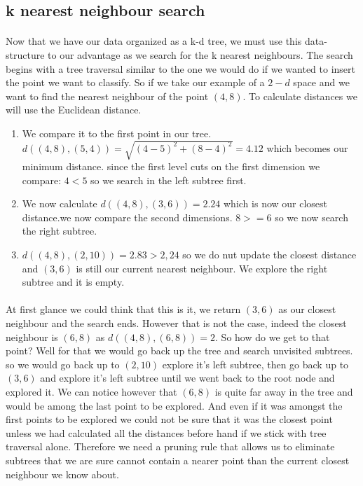 \documentclass[11 pt]{article}
\begin{document}
\subsection{k nearest neighbour search}
\paragraph{}Now that we have our data organized as a k-d tree, we must use this data-structure to our advantage as we search for the k nearest neighbours. The search begins with a tree traversal similar to the one we would do if we wanted to insert the point we want to classify. So if we take our example of a $2-d$ space and we want to find the nearest neighbour of the point $(4,8)$. To calculate distances we will use the Euclidean distance.
\begin{enumerate}
  \item We compare it to the first point in our tree. $d((4,8),(5,4)) = \sqrt{(4-5)^2+(8-4)^2}=4.12$ which becomes our minimum distance. since the first level cuts on the first dimension we compare: $4 < 5$ so we search in the left subtree first.
  \item We now calculate $d((4,8),(3,6))=2.24$ which is now our closest distance.we now compare the second dimensions. $8>=6$ so we now search the right subtree.
  \item $d((4,8),(2,10))=2.83 >2,24$ so we do nut update the closest distance and $(3,6)$ is still our current nearest neighbour. We explore the right subtree and it is empty.
\end{enumerate}
\paragraph{}At first glance we could think that this is it, we return $(3,6)$ as our closest neighbour and the search ends. However that is not the case, indeed the closest neighbour is $(6,8)$ as $d((4,8),(6,8))=2$. So how do we get to that point? Well for that we would go back up the tree and search unvisited subtrees. so we would go back up to $(2,10)$ explore it's left subtree, then go back up to $(3,6)$ and explore it's left subtree until we went back to the root node and explored it. We can notice however that $(6,8)$ is quite far away in the tree and would be among the last point to be explored. And even if it was amongst the first points to be explored we could not be sure that it was the closest point unless we had calculated all the distances before hand if we stick with tree traversal alone. Therefore we need a pruning rule that allows us to eliminate subtrees that we are sure cannot contain a nearer point than the current closest neighbour we know about.
\end{document}
